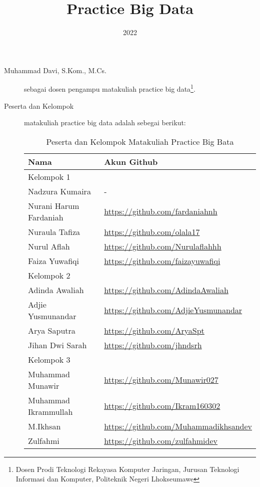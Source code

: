 \documentclass[a4paper]{tufte-handout}
\title{Practice Big Data}
\date{2022}
\begin{document}
\maketitle


\begin{projects}
	\begin{description}
		\item [Muhammad Davi, S.Kom., M.Cs.] sebagai dosen pengampu matakuliah practice big data\footnote{Dosen Prodi Teknologi Rekayasa Komputer Jaringan, Jurusan Teknologi Informasi dan Komputer, Politeknik Negeri Lhokseumawe}.
		\item [Peserta dan Kelompok] matakuliah practice big data adalah sebegai berikut:

\begin{table}[!ht]
\caption{Peserta dan Kelompok Matakuliah Practice Big Bata}
\label{tab:peserta}
\centering
\begin{tabular}{ll} 
\toprule
Nama &	Akun Github\\
\midrule
Kelompok 1\\
\midrule
Nadzura Kumaira			& - \\
Nurani Harum Fardaniah	& \url{https://github.com/fardaniahnh} \\
Nuraula Tafiza			& \url{https://github.com/olala17} \\
Nurul Aflah				& \url{https://github.com/Nurulaflahhh} \\
Faiza Yuwafiqi			& \url{https://github.com/faizayuwafiqi} \\
\midrule
Kelompok 2\\
\midrule
Adinda Awaliah		& \url{https://github.com/AdindaAwaliah} \\
Adjie Yusmunandar	& \url{https://github.com/AdjieYusmunandar} \\
Arya Saputra		& \url{https://github.com/AryaSpt} \\
Jihan Dwi Sarah		& \url{https://github.com/jhndsrh} \\
\midrule
Kelompok 3\\
\midrule
Muhammad Munawir		& \url{https://github.com/Munawir027} \\
Muhammad Ikrammullah	& \url{https://github.com/Ikram160302} \\
M.Ikhsan				& \url{https://github.com/Muhammadikhsandev} \\
Zulfahmi				& \url{https://github.com/zulfahmidev} \\

\end{tabular}
\end{table}
\end{description}
\end{projects}
\end{document}
